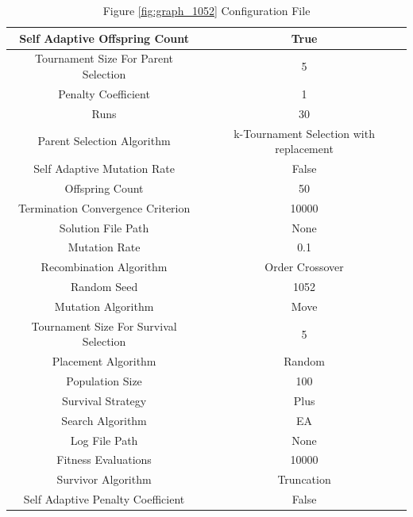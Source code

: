 \documentclass{standalone}
\begin{document}
\begin{table}[!htb]
	\centering
	\caption{Figure \ref{fig:graph_1052} Configuration File}
	\label{tab:graph_1052}
	\begin{tabular}{| c | c |}
		\hline
		Self Adaptive Offspring Count		& True		 \\
		\hline
		Tournament Size For Parent Selection		& 5		 \\
		\hline
		Penalty Coefficient		& 1		 \\
		\hline
		Runs		& 30		 \\
		\hline
		Parent Selection Algorithm		& k-Tournament Selection with replacement		 \\
		\hline
		Self Adaptive Mutation Rate		& False		 \\
		\hline
		Offspring Count		& 50		 \\
		\hline
		Termination Convergence Criterion		& 10000		 \\
		\hline
		Solution File Path		& None		 \\
		\hline
		Mutation Rate		& 0.1		 \\
		\hline
		Recombination Algorithm		& Order Crossover		 \\
		\hline
		Random Seed		& 1052		 \\
		\hline
		Mutation Algorithm		& Move		 \\
		\hline
		Tournament Size For Survival Selection		& 5		 \\
		\hline
		Placement Algorithm		& Random		 \\
		\hline
		Population Size		& 100		 \\
		\hline
		Survival Strategy		& Plus		 \\
		\hline
		Search Algorithm		& EA		 \\
		\hline
		Log File Path		& None		 \\
		\hline
		Fitness Evaluations		& 10000		 \\
		\hline
		Survivor Algorithm		& Truncation		 \\
		\hline
		Self Adaptive Penalty Coefficient		& False		 \\
		\hline
	\end{tabular}
\end{table}
\end{document}
